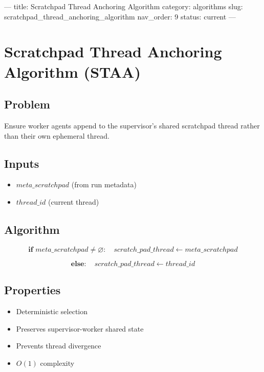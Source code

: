 ---
title: Scratchpad Thread Anchoring Algorithm
category: algorithms
slug: scratchpad_thread_anchoring_algorithm
nav_order: 9
status: current
---

\section{Scratchpad Thread Anchoring Algorithm (STAA)}

\subsection*{Problem}

Ensure worker agents append to the supervisor's shared scratchpad thread
rather than their own ephemeral thread.

\subsection*{Inputs}

\begin{itemize}
    \item $meta\_scratchpad$ (from run metadata)
    \item $thread\_id$ (current thread)
\end{itemize}

\subsection*{Algorithm}

\[
\textbf{if } meta\_scratchpad \neq \varnothing:
\quad scratch\_pad\_thread \leftarrow meta\_scratchpad
\]

\[
\textbf{else}:
\quad scratch\_pad\_thread \leftarrow thread\_id
\]

\subsection*{Properties}

\begin{itemize}
    \item Deterministic selection
    \item Preserves supervisor-worker shared state
    \item Prevents thread divergence
    \item $O(1)$ complexity
\end{itemize}
